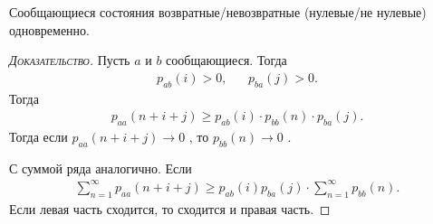 \documentclass[../main.tex]{subfiles}
\begin{document}
\begin{thm}
 Сообщающиеся состояния возвратные/невозвратные (нулевые/не нулевые) одновременно.
\end{thm}
\begin{proof}[\normalfont\textsc{Доказательство}]
 Пусть $ a $ и $ b $ сообщающиеся. Тогда
 \begin{align*}
  p_{ab}(i) > 0, && p_{ba}(j) > 0.
 \end{align*} Тогда
 \begin{align*}
  p_{aa}(n+i+j) \geqslant p_{ab}(i) \cdot p_{bb}(n) \cdot p_{ba}(j).
 \end{align*} Тогда если $ p_{aa}(n+i+j) \to 0 $ , то $ p_{bb}(n) \to 0 $ .

 С суммой ряда аналогично. Если
 \begin{align*}
 \sum_{n=1}^{\infty} p_{aa}(n+i+j) \geqslant p_{ab}(i) p_{ba}(j) \cdot \sum_{n=1}^{\infty}p_{bb}(n).
 \end{align*} Если левая часть сходится, то сходится и правая часть.
\end{proof}
\end{document}
